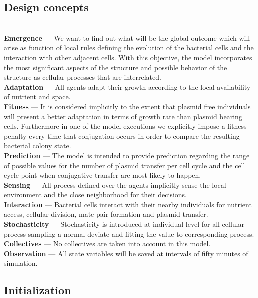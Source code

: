 \subsection{Design concepts}
\
\\
{\bf Emergence} --- We want to find out what will be the global outcome which will arise as function of local rules defining the evolution of the bacterial cells and the interaction with other adjacent cells. With this objective, the model incorporates the most significant aspects of the structure and possible behavior of the structure as cellular processes that are interrelated. 
\\
{\bf Adaptation} --- All agents adapt their growth according to the local availability of nutrient and space.
\\
{\bf Fitness} --- It is considered implicitly to the extent that plasmid free individuals will present a better adaptation in terms of growth rate than plasmid bearing cells. Furthermore in one of the model executions we explicitly impose a fitness penalty every time that conjugation occurs in order to compare the resulting bacterial colony state.
\\
{\bf Prediction} --- The model is intended to provide prediction regarding the range of possible  values  for the number of plasmid transfer per cell cycle and the  cell cycle point when conjugative transfer are most likely to happen.
\\
{\bf Sensing} --- All process defined over the agents implicitly sense the local environment and the close neighborhood for their decisions.
\\
{\bf Interaction} --- Bacterial cells interact with their nearby individuals for nutrient access, cellular division, mate pair formation and plasmid transfer.
\\
{\bf Stochasticity} --- Stochasticity is introduced at individual level for all cellular process sampling a normal deviate and fitting the value to corresponding process.
\\
{\bf Collectives} --- No collectives are taken into account in this model.
\\
{\bf Observation} --- All state variables will be saved at intervals of fifty minutes of simulation.
\\
 
\subsection{Initialization}

